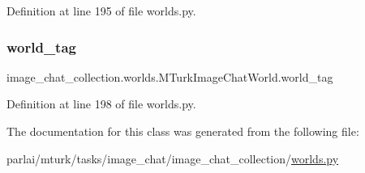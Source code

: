 Definition at line 195 of file worlds.\+py.

\mbox{\label{classimage__chat__collection_1_1worlds_1_1MTurkImageChatWorld_a0be08870bfc570382e035bc0b6119b62}} 
\subsubsection{\texorpdfstring{world\+\_\+tag}{world\_tag}}
{\footnotesize\ttfamily image\+\_\+chat\+\_\+collection.\+worlds.\+M\+Turk\+Image\+Chat\+World.\+world\+\_\+tag}



Definition at line 198 of file worlds.\+py.



The documentation for this class was generated from the following file\+:\begin{DoxyCompactItemize}
\item 
parlai/mturk/tasks/image\+\_\+chat/image\+\_\+chat\+\_\+collection/\hyperlink{parlai_2mturk_2tasks_2image__chat_2image__chat__collection_2worlds_8py}{worlds.\+py}\end{DoxyCompactItemize}
